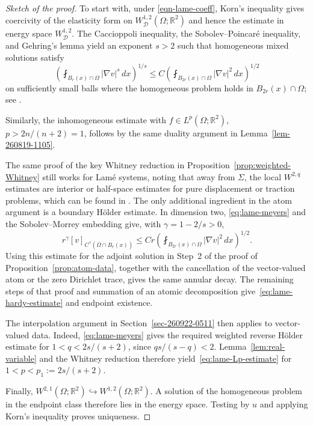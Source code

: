 \documentclass[12pt]{amsart}
\numberwithin{equation}{section}
\newcommand{\bR}{\mathbb{R}}
\newcommand\cD{\mathcal{D}}
\begin{document}
\begin{proof}[Sketch of the proof]
To start with, under \eqref{eqn-lame-coeff}, Korn's inequality gives coercivity of the elasticity form on $W^{1,2}_{\cD}(\Omega;\bR^2)$ and hence the estimate in energy space $W^{1,2}_\cD$. The Caccioppoli inequality, the Sobolev--Poincar\'e inequality, and Gehring's lemma yield an exponent $s>2$ such that homogeneous mixed solutions satisfy
\begin{equation}
 \left(\fint_{B_r(x)\cap\Omega}|\nabla v|^s\,dx\right)^{1/s}
 \leq C\left(\fint_{B_{2r}(x)\cap\Omega}|\nabla v|^2\,dx\right)^{1/2}
 \label{eq:lame-meyers}
\end{equation}
on sufficiently small balls where the homogeneous problem holds in $B_{2r}(x)\cap\Omega$; see \cite[Theorem~3.1]{MR3040944}. 

Similarly, the inhomogeneous estimate with $f \in L^p(\Omega;\bR^2)$, $p > 2n/(n+2) = 1$, follows by the same duality argument in Lemma~\ref{lem-260819-1105}. 

The same proof of the key Whitney reduction in Proposition~\ref{prop:weighted-Whitney} still works for Lam\'e systems, noting that away from $\Sigma$, the local $W^{2,q}$ estimates are interior or half-space estimates for pure displacement or traction problems, which can be found in \cite{MR162050}. 
The only additional ingredient in the atom argument is a boundary H\"older estimate. In dimension two, \eqref{eq:lame-meyers} and the Sobolev--Morrey embedding give, with $\gamma=1-2/s>0$,
\begin{equation}
 r^\gamma[v]_{C^\gamma(\overline{\Omega}\cap B_r(x))}
 \leq Cr\left(\fint_{B_{2r}(x)\cap\Omega}|\nabla v|^2\,dx\right)^{1/2}.
 \label{eq:lame-holder}
\end{equation}
Using this estimate for the adjoint solution in Step~2 of the proof of Proposition~\ref{prop:atom-data}, together with the cancellation of the vector-valued atom or the zero Dirichlet trace, gives the same annular decay. The remaining steps of that proof and summation of an atomic decomposition give~\eqref{eq:lame-hardy-estimate} and endpoint existence.

The interpolation argument in Section~\ref{sec-260922-0511} then applies to vector-valued data. Indeed, \eqref{eq:lame-meyers} gives the required weighted reverse H\"older estimate for $1<q<2s/(s+2)$, since $qs/(s-q)<2$. Lemma~\ref{lem:real-variable} and the Whitney reduction therefore yield~\eqref{eq:lame-Lp-estimate} for $1<p<p_1:=2s/(s+2)$.

Finally, $W^{2,1}(\Omega;\bR^2)\hookrightarrow W^{1,2}(\Omega;\bR^2)$. A solution of the homogeneous problem in the endpoint class therefore lies in the energy space. Testing by $u$ and applying Korn's inequality proves uniqueness.
\end{proof}
\end{document}
